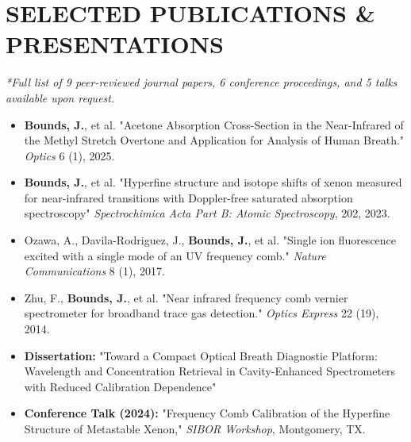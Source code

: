 \documentclass[a4paper,11pt]{extarticle}
\begin{document}
	\section*{SELECTED PUBLICATIONS \& PRESENTATIONS}
	\textit{*Full list of 9 peer-reviewed journal papers, 6 conference proceedings, and 5 talks available upon request.}
	\begin{itemize}[leftmargin=1.2em, itemsep=0.2em]
		\item \textbf{Bounds, J.}, et al. "Acetone Absorption Cross-Section in the Near-Infrared of the Methyl Stretch Overtone and Application for Analysis of Human Breath." \textit{Optics} 6 (1), 2025.
		\item \textbf{Bounds, J.}, et al. "Hyperfine structure and isotope shifts of xenon measured for near-infrared transitions with Doppler-free saturated absorption spectroscopy" \textit{Spectrochimica Acta Part B: Atomic Spectroscopy}, 202, 2023.
		\item Ozawa, A., Davila-Rodriguez, J., \textbf{Bounds, J.}, et al. "Single ion fluorescence excited with a single mode of an UV frequency comb." \textit{Nature Communications} 8 (1), 2017.
		\item Zhu, F., \textbf{Bounds, J.}, et al. "Near infrared frequency comb vernier spectrometer for broadband trace gas detection." \textit{Optics Express} 22 (19), 2014.
		\item \textbf{Dissertation:} "Toward a Compact Optical Breath Diagnostic Platform: Wavelength and Concentration Retrieval in Cavity-Enhanced Spectrometers with Reduced Calibration Dependence"
		\item \textbf{Conference Talk (2024):} "Frequency Comb Calibration of the Hyperfine Structure of Metastable Xenon," \textit{SIBOR Workshop}, Montgomery, TX.
	\end{itemize}
	
\end{document}
